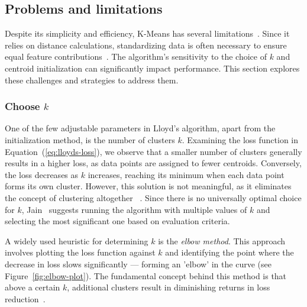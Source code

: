 \documentclass[10pt,twocolumn,letterpaper]{article}
\begin{document}

\subsection{Problems and limitations}\label{subsec:problems-and-limitations}

Despite its simplicity and efficiency, K-Means has several
limitations~\cite{Ezugwu2022104743, FRANTI201995, Jain2010651}. Since it relies
on distance calculations, standardizing data is often necessary to ensure equal
feature contributions~\cite{Morissette2013}. The algorithm’s sensitivity to the
choice of $k$ and centroid initialization can significantly impact performance.
This section explores these challenges and strategies to address them.


\subsubsection{Choose $k$}

One of the few adjustable parameters in Lloyd's algorithm, apart from the
initialization method, is the number of clusters $k$. Examining the loss
function in Equation~(\ref{eq:lloyds-loss}), we observe that a smaller number
of clusters generally results in a higher loss, as data points are assigned to
fewer centroids. Conversely, the loss decreases as $k$ increases, reaching its
minimum when each data point forms its own cluster. However, this solution is
not meaningful, as it eliminates the concept of clustering altogether
~\cite{deuschle2019}. Since there is no universally optimal choice for $k$,
Jain~\cite{Jain2010651} suggests running the algorithm with multiple values of
$k$ and selecting the most significant one based on evaluation criteria.

A widely used heuristic for determining $k$ is the \textit{elbow method}. This
approach involves plotting the loss function against $k$ and identifying the
point where the decrease in loss slows significantly — forming an 'elbow' in
the curve (see Figure~\ref{fig:elbow-plot}). The fundamental concept behind
this method is that above a certain $k$, additional clusters result in
diminishing returns in loss reduction~\cite{deuschle2019}.
\end{document}
